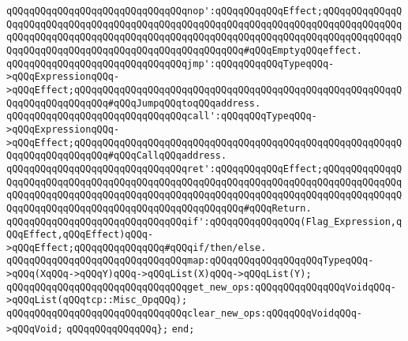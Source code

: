 \verb|qQQqqQQqqQQqqQQqqQQqqQQqqQQqqQQqnop':qQQqqQQqqQQqEffect;qQQqqQQqqQQqqQQqqQQqqQQqqQQqqQQqqQQqqQQqqQQqqQQqqQQqqQQqqQQqqQQqqQQqqQQqqQQqqQQqqQQqqQQqqQQqqQQqqQQqqQQqqQQqqQQqqQQqqQQqqQQqqQQqqQQqqQQqqQQqqQQqqQQqqQQqqQQqqQQqqQQqqQQqqQQqqQQqqQQqqQQqqQQqqQQqqQQq#qQQqEmptyqQQqeffect.|\newline
\verb|qQQqqQQqqQQqqQQqqQQqqQQqqQQqqQQqjmp':qQQqqQQqqQQqTypeqQQq->qQQqExpressionqQQq->qQQqEffect;qQQqqQQqqQQqqQQqqQQqqQQqqQQqqQQqqQQqqQQqqQQqqQQqqQQqqQQqqQQqqQQqqQQqqQQqqQQq#qQQqJumpqQQqtoqQQqaddress.|\newline
\verb|qQQqqQQqqQQqqQQqqQQqqQQqqQQqqQQqcall':qQQqqQQqTypeqQQq->qQQqExpressionqQQq->qQQqEffect;qQQqqQQqqQQqqQQqqQQqqQQqqQQqqQQqqQQqqQQqqQQqqQQqqQQqqQQqqQQqqQQqqQQqqQQqqQQq#qQQqCallqQQqaddress.|\newline
\verb|qQQqqQQqqQQqqQQqqQQqqQQqqQQqqQQqret':qQQqqQQqqQQqEffect;qQQqqQQqqQQqqQQqqQQqqQQqqQQqqQQqqQQqqQQqqQQqqQQqqQQqqQQqqQQqqQQqqQQqqQQqqQQqqQQqqQQqqQQqqQQqqQQqqQQqqQQqqQQqqQQqqQQqqQQqqQQqqQQqqQQqqQQqqQQqqQQqqQQqqQQqqQQqqQQqqQQqqQQqqQQqqQQqqQQqqQQqqQQqqQQqqQQq#qQQqReturn.|\newline
\verb|qQQqqQQqqQQqqQQqqQQqqQQqqQQqqQQqif':qQQqqQQqqQQqqQQq(Flag_Expression,qQQqEffect,qQQqEffect)qQQq->qQQqEffect;qQQqqQQqqQQqqQQq#qQQqif/then/else.|\newline
\newline
\verb|qQQqqQQqqQQqqQQqqQQqqQQqqQQqqQQqmap:qQQqqQQqqQQqqQQqqQQqTypeqQQq->qQQq(XqQQq->qQQqY)qQQq->qQQqList(X)qQQq->qQQqList(Y);|\newline
\newline
\verb|qQQqqQQqqQQqqQQqqQQqqQQqqQQqqQQqget_new_ops:qQQqqQQqqQQqqQQqVoidqQQq->qQQqList(qQQqtcp::Misc_OpqQQq);|\newline
\verb|qQQqqQQqqQQqqQQqqQQqqQQqqQQqqQQqclear_new_ops:qQQqqQQqVoidqQQq->qQQqVoid;|\newline
\verb|qQQqqQQqqQQqqQQq};|\newline
\verb|end;|\newline

